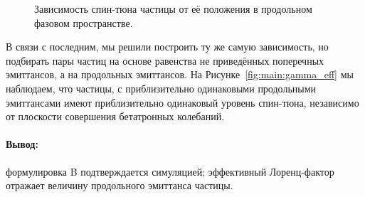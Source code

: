 \begin{figure}[h]
  \centering
  \caption{Зависимость спин-тюна частицы от её положения в продольном фазовом пространстве.\label{fig:main}}
\end{figure}

В связи с последним, мы решили построить ту же самую зависимость, но подбирать пары частиц на основе равенства не приведённых поперечных эмиттансов, а на продольных эмиттансов. На Рисунке~\ref{fig:main:gamma_eff} мы наблюдаем, что частицы, с приблизительно одинаковыми продольными эмиттансами имеют приблизительно одинаковый уровень спин-тюна, независимо от плоскости совершения бетатронных колебаний.

\paragraph{Вывод:} формулировка B подтверждается симуляцией; эффективный Лоренц-фактор отражает величину продольного эмиттанса частицы.
